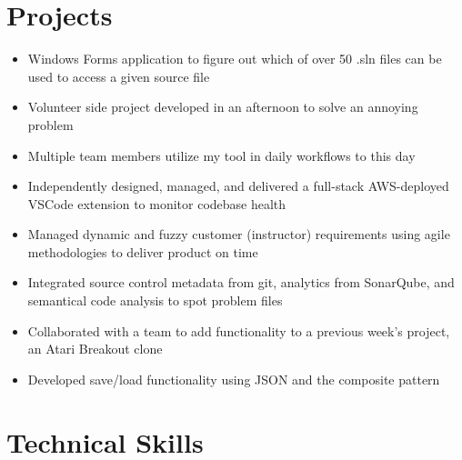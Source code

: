 \documentclass[10pt,a4paper,sans]{moderncv}
\begin{document}
\section{Projects}
\begin{itemize}
\item Windows Forms application to figure out which of over 50 .sln files can be used to access a given source file 
\item Volunteer side project developed in an afternoon to solve an annoying problem
\item Multiple team members utilize my tool in daily workflows to this day
\end{itemize}

\begin{itemize}
\item Independently designed, managed, and delivered a full-stack AWS-deployed VSCode extension to monitor codebase health
\item Managed dynamic and fuzzy customer (instructor) requirements using agile methodologies to deliver product on time
\item Integrated source control metadata from git, analytics from SonarQube, and semantical code analysis to spot problem files
\end{itemize}
\begin{itemize}
\item Collaborated with a team to add functionality to a previous week’s project, an Atari Breakout clone
\item Developed save/load functionality using JSON and the composite pattern
\end{itemize}

\section{Technical Skills}
\end{document}
